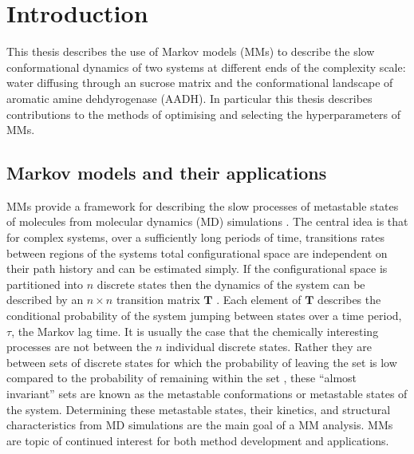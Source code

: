 %
%
\let\textcircled=\pgftextcircled
\chapter{Introduction}
\label{chap:intro}
This thesis describes the use of Markov models (MMs) to describe the slow conformational  dynamics of two systems at different ends of the complexity scale: water diffusing through an sucrose matrix and the conformational landscape of aromatic amine dehdyrogenase (AADH). In particular this thesis describes contributions to the methods of optimising and selecting the hyperparameters of MMs. 

% 

\section{Markov models and their applications}
MMs provide a framework for describing the slow processes of metastable states of molecules from molecular dynamics (MD) simulations \cite{prinzMarkovModelsMolecular2011}. The central idea \cite{zwanzigClassicalDynamicsContinuous1983a} is that for complex systems, over a sufficiently long periods of time, transitions rates between regions of the systems total configurational space are independent on their path history and can be estimated simply. If the configurational space is partitioned into $n$ discrete states then the dynamics of the system can be described by an $n\times n$ transition matrix $\mathbf{T}$ \cite{prinzMarkovModelsMolecular2011}. Each element of $\mathbf{T}$ describes the conditional probability of the system jumping between states \cite{prinzMarkovModelsMolecular2011} over a time period, $\tau$, the Markov lag time. It is usually the case that the chemically interesting processes are not between the $n$ individual discrete states. Rather they are between sets of discrete states for which the probability of leaving the set is low compared to the probability of remaining within the set \cite{schutteDirectApproachConformational1999}, these ``almost invariant'' sets are known as the metastable conformations or metastable states of the system. Determining these metastable states, their kinetics, and structural characteristics from MD simulations are the main goal of a MM analysis. MMs are  topic of continued interest \cite{husicMarkovStateModels2018}\cite{noeMarkovModelsMolecular2019b}\cite{wangConstructingMarkovState2018c} for both method development and applications.  


